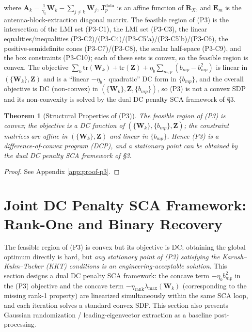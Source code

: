 \documentclass[12pt,a4paper]{article}
\newtheorem{theorem}{Theorem}
\newcommand{\mat}[1]{\mathbf{#1}}
\newcommand{\tr}{\text{tr}}
\begin{document}
where $\mat{A}_k = \frac{1}{\gamma_k} \mat{W}_k - \sum_{j \neq k} \mat{W}_j$, $\mat{J}_p^{\text{data}}$ is an affine function of $\mat{R}_X$, and $\mat{E}_m$ is the antenna-block-extraction diagonal matrix. The feasible region of (P3) is the intersection of the LMI set (P3-C1), the LMI set (P3-C3), the linear equalities/inequalities (P3-C2)/(P3-C4)/(P3-C5'a)/(P3-C5'b)/(P3-C6), the positive-semidefinite cones (P3-C7)/(P3-C8), the scalar half-space (P3-C9), and the box constraints (P3-C10); each of these sets is convex, so the feasible region is convex. The objective $\sum_k \tr(\mat{W}_k) + \tr(\mat{Z}) + \eta_b \sum_{m,p} (b_{mp} - b_{mp}^2)$ is linear in $(\{\mat{W}_k\}, \mat{Z})$ and is a ``linear $-\eta_b \cdot$ quadratic'' DC form in $\{b_{mp}\}$, and the overall objective is DC (non-convex) in $(\{\mat{W}_k\}, \mat{Z}, \{b_{mp}\})$, so (P3) is not a convex SDP and its non-convexity is solved by the dual DC penalty SCA framework of \S3.

\begin{theorem}[Structural Properties of (P3)]\label{thm:p3-structure}
The feasible region of (P3) is convex; the objective is a DC function of $(\{\mat{W}_k\}, \{b_{mp}\}, \mat{Z})$; the constraint matrices are affine in $(\{\mat{W}_k\}, \mat{Z})$ and linear in $\{b_{mp}\}$. Hence (P3) is a difference-of-convex program (DCP), and a stationary point can be obtained by the dual DC penalty SCA framework of \S3.
\end{theorem}

\begin{proof}
See Appendix \ref{app:proof-p3}.
\end{proof}

\section{Joint DC Penalty SCA Framework: Rank-One and Binary Recovery}\label{sec:sca}

The feasible region of (P3) is convex but its objective is DC; obtaining the global optimum directly is hard, but \emph{any stationary point of (P3) satisfying the Karush--Kuhn--Tucker (KKT) conditions is an engineering-acceptable solution}. This section designs a dual DC penalty SCA framework: the concave term $-\eta_b b_{mp}^2$ in the (P3) objective and the concave term $-\eta_{\text{rank}} \lambda_{\max}(\mat{W}_k)$ (corresponding to the missing rank-1 property) are linearized simultaneously within the same SCA loop, and each iteration solves a standard convex SDP. This section also presents Gaussian randomization / leading-eigenvector extraction as a baseline post-processing.
\end{document}
